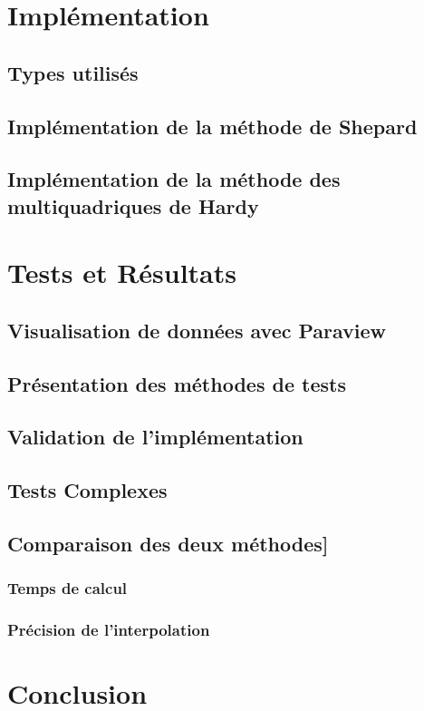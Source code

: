 \documentclass[a4paper,9pt]{article}
\begin{document}
\section{Implémentation}
\label{sec:implementation}

\subsection{Types utilisés}
\label{subsec:types}

\subsection{Implémentation de la méthode de Shepard}
\label{subsec:shepard_implementation}

\subsection{Implémentation de la méthode des multiquadriques de Hardy}
\label{subsec:hardy_implementation}

\section{Tests et Résultats}
\label{sec:tests_resultats}

\subsection{Visualisation de données avec Paraview}
\label{subsec:paraview}

\subsection{Présentation des méthodes de tests}
\label{subsec:presentation_tests}

\subsection{Validation de l'implémentation}
\label{subsec:validation_implementation}

\subsection{Tests Complexes}
\label{subsec:tests_complexes}

\subsection{Comparaison des deux méthodes]}
\label{subsec:comparaison_methodes}

\subsubsection{Temps de calcul}
\label{subsec:temps_calcul}

\subsubsection{Précision de l'interpolation}
\label{subsec:precision_interpolation}

\section{Conclusion}
\label{sec:conclusion}
\end{document}
